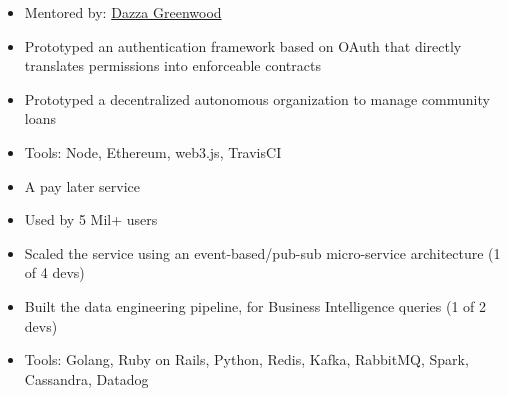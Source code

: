 \documentclass[11pt,a4paper,sans]{moderncv}
\begin{document}
{
    \begin{itemize}
    \item Mentored by: \href{https://web.media.mit.edu/~dang/}{Dazza Greenwood}
    \item Prototyped an authentication framework based on OAuth that directly
    translates permissions into enforceable contracts
    \item Prototyped a decentralized autonomous organization to manage community
        loans
    \item Tools: Node, Ethereum, web3.js, TravisCI
    \end{itemize}
}

{
    \begin{itemize}
    \item A pay later service
    \item Used by 5 Mil+ users
    \item Scaled the service using an event-based/pub-sub micro-service
    architecture (1 of 4 devs)
    \item Built the data engineering pipeline, for Business Intelligence queries
    (1 of 2 devs)
    \item Tools: Golang, Ruby on Rails, Python, Redis, Kafka, RabbitMQ, Spark,
    Cassandra, Datadog
    \end{itemize}
}

\end{document}
